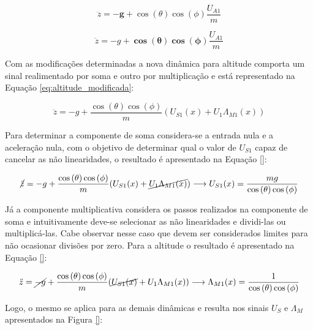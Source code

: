 \documentclass[main.tex]{subfiles}
\begin{document}
\textcolor{att}{
\begin{equation}\label{eq:exemplo_altitude_soma}
    \ddot{z} = \boldsymbol{-g} + \cos{(\theta)}\cos{(\phi)}\frac{U_{A1}}{m}
\end{equation}
}

\textcolor{att}{
\begin{equation}\label{eq:exemplo_altitude_multiplicacao}
    \ddot{z} = -g + \boldsymbol{\cos{(\theta)}\cos{(\phi)}}\frac{U_{A1}}{m}
\end{equation}
}

\textcolor{att}{
Com as modificações determinadas a nova dinâmica para altitude comporta um sinal realimentado por soma e outro por multiplicação e está representado na Equação \ref{eq:altitude_modificada}:
}

\textcolor{att}{
\begin{equation}\label{eq:altitude_modificada}
    \ddot{z} = -g + \frac{\cos{(\theta)}\cos{(\phi)}}{m}(U_{S1}(x) + U_1\Lambda_{M1}(x))
\end{equation}
}

\textcolor{att}{
Para determinar a componente de soma considera-se a entrada nula e a aceleração nula, com o objetivo de determinar qual o valor de $U_{S1}$ capaz de cancelar as não linearidades, o resultado é apresentado na Equação \ref{}:
}

\textcolor{att}{
\begin{equation}
    \cancel{\ddot{z}} = -g + \frac{\cos{(\theta)}\cos{(\phi)}}{m}(U_{S1}(x) + \cancel{U_1\Lambda_{M1}(x)}) \longrightarrow U_{S1}(x) = \frac{mg}{\cos{(\theta)}\cos{(\phi)}}
\end{equation}
}

\textcolor{att}{
Já a componente multiplicativa considera os passos realizados na componente de soma e intuitivamente deve-se selecionar as não linearidades e dividi-las ou multiplicá-las. Cabe observar nesse caso que devem ser considerados limites para não ocasionar divisões por zero. Para a altitude o resultado é apresentado na Equação \ref{}:
}

\textcolor{att}{
\begin{equation}
    \ddot{z} = \cancel{-g} + \frac{\cos{(\theta)}\cos{(\phi)}}{m}(\cancel{U_{S1}(x)} + U_1\Lambda_{M1}(x)) \longrightarrow \Lambda_{M1}(x) = \frac{1}{\cos{(\theta)}\cos{(\phi)}}
\end{equation}
}

\textcolor{att}{
Logo, o mesmo se aplica para as demais dinâmicas e resulta nos sinais $U_S$ e $\Lambda_M$ apresentados na Figura \ref{}:
}
\end{document}
